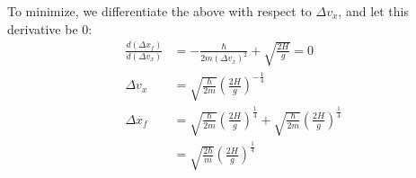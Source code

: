 \documentclass[a4paper, 12pt, addpoints]{exam}
\begin{document}
\begin{questions}
\begin{tcolorbox}
To minimize, we differentiate the above with respect to $\Delta v_x$, and let this derivative be 0:
\begin{align*}
    \frac{d(\Delta x_f)}{d(\Delta v_x)} &= -\frac{\hbar}{2m(\Delta v_x)^2} + \sqrt{\frac{2H}{g}} = 0 \\
    \Delta v_x &= \sqrt{\frac{\hbar}{2m}} \left(\frac{2H}{g} \right)^{-\frac{1}4} \\
    \Delta x_f &= \sqrt{\frac{\hbar}{2m}} \left(\frac{2H}{g} \right)^{\frac{1}4} + \sqrt{\frac{\hbar}{2m}} \left(\frac{2H}{g} \right)^{\frac{1}4} \\ &= \sqrt{\frac{2\hbar}{m}} \left(\frac{2H}{g} \right)^{\frac{1}4}
\end{align*}

\end{tcolorbox}

\end{questions}
\end{document}
